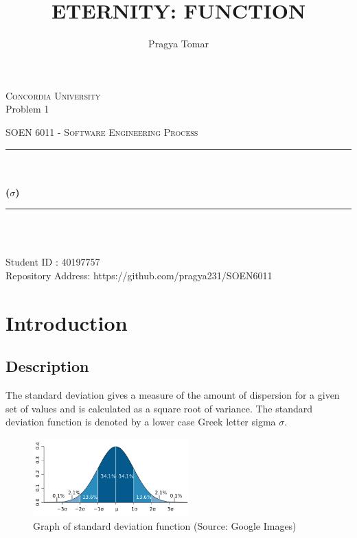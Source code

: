 \documentclass[12pt]{report}
\title{ETERNITY: FUNCTION}
\author{Pragya Tomar}
\date{}
\makeatletter
\let\thetitle\@title
\let\theauthor\@author
\makeatother
\begin{document}
\begin{titlepage}
	\centering
    \vspace*{1 cm}
\begin{center}    \textsc{\Large Concordia University}\\[2.5 cm]
{Problem 1 }\\[0.4 cm]
\end{center}
	\textsc{\Large  SOEN 6011 - Software Engineering Process }\\[1 cm]
	\rule{\linewidth}{0.5 mm} \\[0.4 cm]
	{ \huge \textbf \thetitle}\\[0.5 cm]
	{ \huge \textbf{($\sigma$)}}
	\rule{\linewidth}{0.5 mm} \\[1.0 cm]

	
\begin{center}   {\Large \textbf{\theauthor}} \\[1 cm]
                 {\large Student ID : 40197757 }\\[0.4 cm]
                 {\large Repository Address: https://github.com/pragya231/SOEN6011}
\end{center}
	
\end{titlepage}

\tableofcontents
\pagebreak

\renewcommand{\thesection}{\arabic{section}}
\section{\Large \vspace{0.1 cm}Introduction}

\subsection{\Large \vspace{0.1 cm}Description}
The standard deviation gives a measure of the amount of dispersion for a given set of values and is calculated as a square root of variance. The standard deviation function is denoted by a lower case Greek letter sigma $\sigma$.

\begin{figure}[h!]
\begin{center}
  \includegraphics[width=6cm, height=3cm]{Standard_deviation_diagram.svg_.png}
  \end{center}
  \caption{Graph of standard deviation function (Source: Google Images)}
\end{figure}
\end{document}
